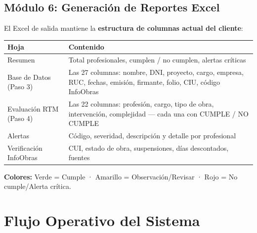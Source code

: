 \documentclass[11pt,a4paper]{article}
\begin{document}
\subsection{Módulo 6: Generación de Reportes Excel}

El Excel de salida mantiene la \textbf{estructura de columnas actual del cliente}:

\begin{center}
\begin{tabular}{|>{\raggedright\arraybackslash}m{4cm}|>{\raggedright\arraybackslash}m{8.5cm}|}
\hline
\textbf{Hoja} & \textbf{Contenido} \\
\hline
Resumen & Total profesionales, cumplen / no cumplen, alertas críticas \\
\hline
Base de Datos (Paso 3) & Las 27 columnas: nombre, DNI, proyecto, cargo, empresa, RUC, fechas, emisión, firmante, folio, CIU, código InfoObras \\
\hline
Evaluación RTM (Paso 4) & Las 22 columnas: profesión, cargo, tipo de obra, intervención, complejidad --- cada una con CUMPLE / NO CUMPLE \\
\hline
Alertas & Código, severidad, descripción y detalle por profesional \\
\hline
Verificación InfoObras & CUI, estado de obra, suspensiones, días descontados, fuentes \\
\hline
\end{tabular}
\end{center}

\textbf{Colores:} Verde = Cumple · Amarillo = Observación/Revisar · Rojo = No cumple/Alerta crítica.

\section{Flujo Operativo del Sistema}
\end{document}
